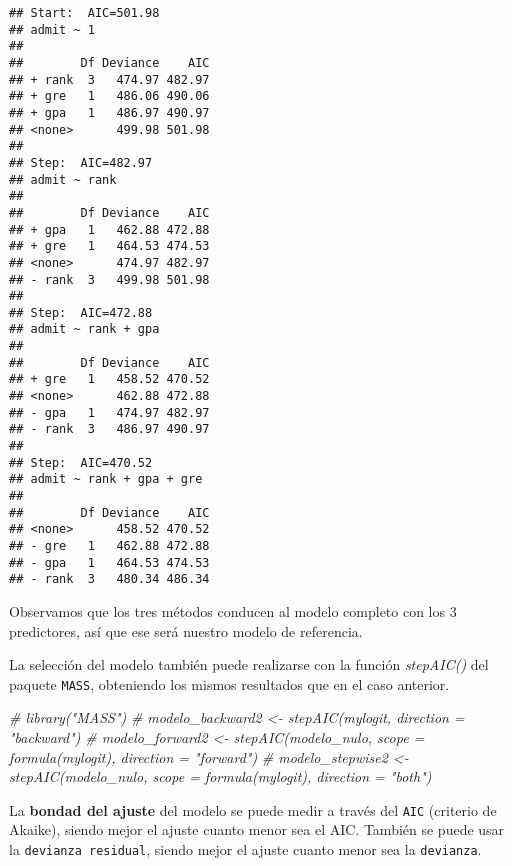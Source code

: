 \documentclass[
]{article}
\newenvironment{Shaded}{\begin{snugshade}}{\end{snugshade}}
\newcommand{\CommentTok}[1]{\textcolor[rgb]{0.56,0.35,0.01}{\textit{#1}}}
\newcommand{\NormalTok}[1]{#1}
\newcommand{\SpecialCharTok}[1]{\textcolor[rgb]{0.81,0.36,0.00}{\textbf{#1}}}
\begin{document}
\begin{verbatim}
## Start:  AIC=501.98
## admit ~ 1
## 
##        Df Deviance    AIC
## + rank  3   474.97 482.97
## + gre   1   486.06 490.06
## + gpa   1   486.97 490.97
## <none>      499.98 501.98
## 
## Step:  AIC=482.97
## admit ~ rank
## 
##        Df Deviance    AIC
## + gpa   1   462.88 472.88
## + gre   1   464.53 474.53
## <none>      474.97 482.97
## - rank  3   499.98 501.98
## 
## Step:  AIC=472.88
## admit ~ rank + gpa
## 
##        Df Deviance    AIC
## + gre   1   458.52 470.52
## <none>      462.88 472.88
## - gpa   1   474.97 482.97
## - rank  3   486.97 490.97
## 
## Step:  AIC=470.52
## admit ~ rank + gpa + gre
## 
##        Df Deviance    AIC
## <none>      458.52 470.52
## - gre   1   462.88 472.88
## - gpa   1   464.53 474.53
## - rank  3   480.34 486.34
\end{verbatim}

Observamos que los tres métodos conducen al modelo completo con los 3
predictores, así que ese será nuestro modelo de referencia.

La selección del modelo también puede realizarse con la función
\emph{stepAIC()} del paquete \texttt{MASS}, obteniendo los mismos
resultados que en el caso anterior.

\begin{Shaded}
\begin{Highlighting}[]
\CommentTok{\# library("MASS")}
\CommentTok{\# modelo\_backward2 \textless{}{-} stepAIC(mylogit, direction = "backward")}
\CommentTok{\# modelo\_forward2 \textless{}{-} stepAIC(modelo\_nulo, scope = formula(mylogit), direction = "forward")}
\CommentTok{\# modelo\_stepwise2 \textless{}{-} stepAIC(modelo\_nulo, scope = formula(mylogit), direction = "both")}
\end{Highlighting}
\end{Shaded}

La \textbf{bondad del ajuste} del modelo se puede medir a través del
\texttt{AIC} (criterio de Akaike), siendo mejor el ajuste cuanto menor
sea el AIC. También se puede usar la \texttt{devianza\ residual}, siendo
mejor el ajuste cuanto menor sea la \texttt{devianza}.

\begin{Shaded}
\end{Shaded}
\end{document}
